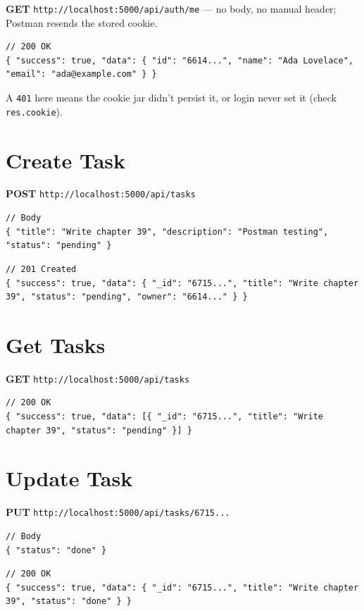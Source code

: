 \textbf{GET} \texttt{http://localhost:5000/api/auth/me} --- no body, no
manual header; Postman resends the stored cookie.

\begin{lstlisting}
// 200 OK
{ "success": true, "data": { "id": "6614...", "name": "Ada Lovelace", "email": "ada@example.com" } }
\end{lstlisting}

A \texttt{401} here means the cookie jar didn't persist it, or login never
set it (check \texttt{res.cookie}).

\section{Create Task}

\textbf{POST} \texttt{http://localhost:5000/api/tasks}

\begin{lstlisting}
// Body
{ "title": "Write chapter 39", "description": "Postman testing", "status": "pending" }
\end{lstlisting}

\begin{lstlisting}
// 201 Created
{ "success": true, "data": { "_id": "6715...", "title": "Write chapter 39", "status": "pending", "owner": "6614..." } }
\end{lstlisting}

\section{Get Tasks}

\textbf{GET} \texttt{http://localhost:5000/api/tasks}

\begin{lstlisting}
// 200 OK
{ "success": true, "data": [{ "_id": "6715...", "title": "Write chapter 39", "status": "pending" }] }
\end{lstlisting}

\section{Update Task}

\textbf{PUT} \texttt{http://localhost:5000/api/tasks/6715...}

\begin{lstlisting}
// Body
{ "status": "done" }
\end{lstlisting}

\begin{lstlisting}
// 200 OK
{ "success": true, "data": { "_id": "6715...", "title": "Write chapter 39", "status": "done" } }
\end{lstlisting}

